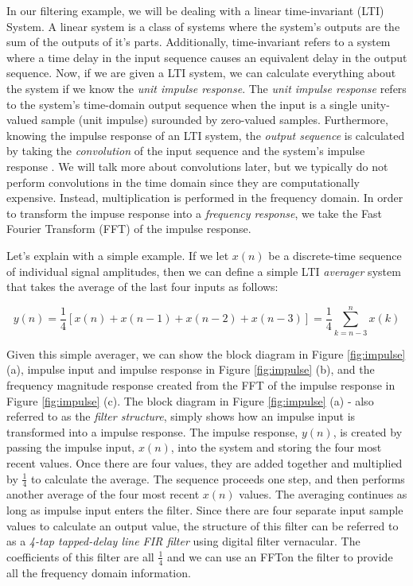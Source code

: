 	In our filtering example, we will be dealing with a linear time-invariant (LTI) System.  A linear system is a class of systems where the system's outputs are the sum of the outputs of it's parts.  Additionally, time-invariant refers to a system where a time delay in the input sequence causes an equivalent delay in the output sequence.  Now, if we are given a LTI system, we can calculate everything about the system if we know the \textit{unit impulse response}.  The \textit{unit impulse response} refers to the system's time-domain output sequence when the input is a single unity-valued sample (unit impulse) surounded by zero-valued samples.  Furthermore, knowing the impulse response of an LTI system, the \textit{output sequence} is calculated by taking the \textit{convolution}  of the input sequence and the system's impulse response \cite{lyons:intro}.  We will talk more about convolutions later, but we typically do not perform convolutions in the time domain since they are computationally expensive.  Instead, multiplication is performed in the frequency domain.  In order to transform the impuse response into a \textit{frequency response}, we take the Fast Fourier Transform (FFT) of the impulse response\cite{lyons:intro}.

Let's explain with a simple example.  If we let $x(n)$ be a discrete-time sequence of individual signal amplitudes, then we can define a simple LTI \textit{averager} system that takes the average of the last four inputs  as follows: 

$$y(n) = \frac{1}{4} \left[ x(n)+x(n-1)+x(n-2)+x(n-3)\right] =  \frac{1}{4}\sum_{k=n-3}^{n} x(k)$$    

Given this simple averager, we can show the block diagram in Figure \ref{fig:impulse} (a), impulse input and impulse response in Figure \ref{fig:impulse} (b), and the frequency magnitude response created from the FFT of the impulse response in Figure \ref{fig:impulse} (c).  The block diagram in Figure \ref{fig:impulse} (a) - also referred to as the \textit{filter structure}, simply shows how an impulse input is transformed into a impulse response.  The impulse response, $y(n)$, is created by passing the impulse input, $x(n)$, into the system and storing the four most recent values.  Once there are four values, they are added together and multiplied by $\frac{1}{4}$ to calculate the average.  The sequence proceeds one step, and then performs another average of the four most recent $x(n)$ values.  The averaging continues as long as impulse input enters the filter.   Since there are four separate input sample values to calculate an output value, the structure of this filter can be referred to as a \textit{4-tap tapped-delay line FIR filter} using digital filter vernacular.  The coefficients of this filter are all $\frac{1}{4}$ and we can use an FFTon the filter to provide all the frequency domain information.

